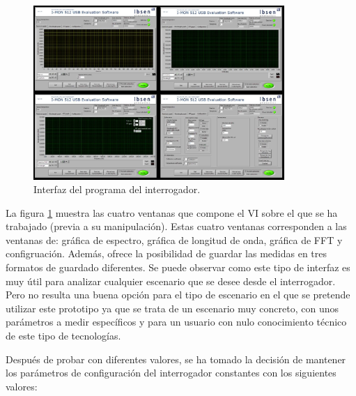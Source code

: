 \begin{itemize} [label=]
	\begin{figure}[H]
		\centering
		\includegraphics[width=0.85\textwidth]{./img/softwareInterrogador2}
		\caption{Interfaz del programa del interrogador.} 
		\label{fig:interrogadorPantalla}
	\end{figure}
	La figura \ref{fig:interrogadorPantalla} muestra las cuatro ventanas que compone el VI sobre el que se ha trabajado (previa a su manipulación). Estas cuatro ventanas corresponden a las ventanas de: gráfica de espectro, gráfica de longitud de onda, gráfica de FFT y configruación. Además, ofrece la posibilidad de guardar las medidas en tres formatos de guardado diferentes. Se puede observar como este tipo de interfaz es muy útil para analizar cualquier escenario que se desee desde el interrogador. Pero no resulta una buena opción para el tipo de escenario en el que se pretende utilizar este prototipo ya que se trata de un escenario muy concreto, con unos parámetros a medir específicos y para un usuario con nulo conocimiento técnico de este tipo de tecnologías.
	
		Después de probar con diferentes valores, se ha tomado la decisión de mantener los parámetros de configuración del interrogador constantes con los siguientes valores:
	

\end{itemize}

